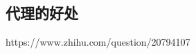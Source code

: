 \documentclass[../../../interview-questions.tex]{subfiles}
\begin{document}
\subsection{代理的好处}

https://www.zhihu.com/question/20794107
\end{document}
